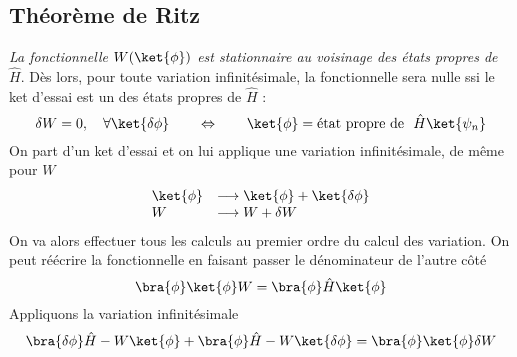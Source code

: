 		
	\subsection{Théorème de Ritz}
	\textit{La fonctionnelle $W(\ket{\phi})$ est stationnaire au voisinage des états propres de 
	$\hat H$}. Dès lors, pour toute variation infinitésimale, la fonctionnelle sera nulle ssi le ket 
	d'essai est un des états propres de $\hat H$ : 
	\begin{equation}
	\delta W = 0,\quad \forall\ket{\delta\phi}\qquad \Leftrightarrow\qquad \ket{\phi} = 
	\text{état propre de }\ \hat{H}\ket{\psi_n}
	\end{equation}
	On part d'un ket d'essai et on lui applique une variation infinitésimale, de même pour $W$
	\begin{equation}
	\begin{array}{ll}
	\ket{\phi} &\longrightarrow \ket{\phi}+\ket{\delta\phi}\\
	W &\longrightarrow W +\delta W
	\end{array}
	\end{equation}
	On va alors effectuer tous les calculs au premier ordre du calcul des variation. On peut 
	réécrire la fonctionnelle en faisant passer le dénominateur de l'autre côté
	\begin{equation}
	\bra{\phi}\ket{\phi}W = \bra{\phi}\hat{H}\ket{\phi}
	\end{equation}
	Appliquons la variation infinitésimale
	\begin{equation}
	\bra{\delta \phi}\hat{H}-W\ket{\phi} + \bra{\phi}\hat{H}-W\ket{\delta\phi}=\bra{\phi}\ket{\phi}
	\delta W
	\end{equation}

